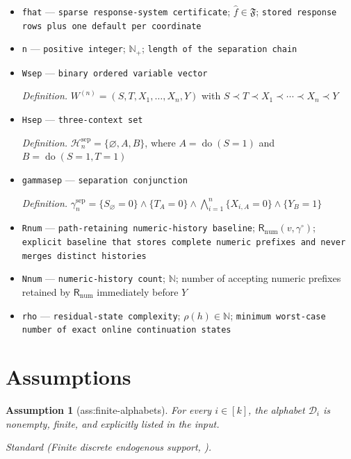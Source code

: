 \documentclass{article}
\newtheorem{assumption}{Assumption}
\begin{document}
\begin{itemize}
  \item \texttt{fhat} --- \texttt{sparse response-\allowbreak{}system certificate}; \(\widehat f\in\mathfrak F\); \texttt{stored response rows plus one default per coordinate}
  \item \texttt{n} --- \texttt{positive integer}; \(\mathbb N_{+}\); \texttt{length of the separation chain}
  \item \texttt{Wsep} --- \texttt{binary ordered variable vector}
  \par\smallskip\noindent\emph{Definition.} \(W^{(n)}=(S,T,X_1,\ldots,X_n,Y)\) with \(S\prec T\prec X_1\prec\cdots\prec X_n\prec Y\)
  \item \texttt{Hsep} --- \texttt{three-\allowbreak{}context set}
  \par\smallskip\noindent\emph{Definition.} \(\mathcal H_n^{\mathrm{sep}}=\{\varnothing,A,B\}\), where \(A=\operatorname{do}(S=1)\) and \(B=\operatorname{do}(S=1,T=1)\)
  \item \texttt{gammasep} --- \texttt{separation conjunction}
  \par\smallskip\noindent\emph{Definition.} \(\gamma_n^{\mathrm{sep}}=\{S_{\varnothing}=0\}\wedge\{T_A=0\}\wedge\bigwedge_{i=1}^n\{X_{i,A}=0\}\wedge\{Y_B=1\}\)
  \item \texttt{Rnum} --- \texttt{path-\allowbreak{}retaining numeric-\allowbreak{}history baseline}; \(\mathsf R_{\mathrm{num}}(v,\gamma^{\circ})\); \texttt{explicit baseline that stores complete numeric prefixes and never merges distinct histories}
  \item \texttt{Nnum} --- \texttt{numeric-\allowbreak{}history count}; \(\mathbb N\); number of accepting numeric prefixes retained by \(\mathsf R_{\mathrm{num}}\) immediately before \(Y\)
  \item \texttt{rho} --- \texttt{residual-\allowbreak{}state complexity}; \(\rho(h)\in\mathbb N\); \texttt{minimum worst-\allowbreak{}case number of exact online continuation states}
\end{itemize}

\section{Assumptions}

\begin{assumption}[ass:finite-alphabets]\label{ass:finite-alphabets}
For every \(i\in[k]\), the alphabet \(\mathcal D_i\) is nonempty, finite, and explicitly listed in the input.
\par\smallskip\noindent\emph{Standard} (Finite discrete endogenous support, \cite{RossettoAntonucci2026}).
\end{assumption}
\end{document}
